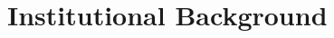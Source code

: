 \documentclass[aspectratio=169, 11pt]{beamer}
\begin{document}

\section{Institutional Background}
\end{document}
